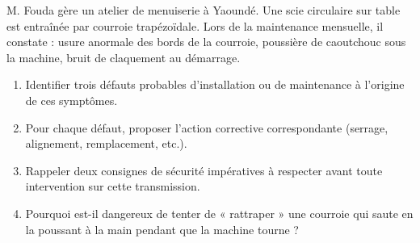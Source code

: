 \documentclass[11pt]{article}
\begin{document}
\begin{exercice}
M. Fouda gère un atelier de menuiserie à Yaoundé. Une scie circulaire sur table est entraînée par courroie trapézoïdale. Lors de la maintenance mensuelle, il constate : usure anormale des bords de la courroie, poussière de caoutchouc sous la machine, bruit de claquement au démarrage.
\begin{enumerate}
    \item Identifier trois défauts probables d'installation ou de maintenance à l'origine de ces symptômes.
    \item Pour chaque défaut, proposer l'action corrective correspondante (serrage, alignement, remplacement, etc.).
    \item Rappeler deux consignes de sécurité impératives à respecter avant toute intervention sur cette transmission.
    \item Pourquoi est-il dangereux de tenter de « rattraper » une courroie qui saute en la poussant à la main pendant que la machine tourne ?
\end{enumerate}
\end{exercice}
\end{document}
